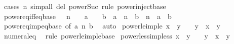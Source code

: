 \begin{isabellebody}
\ {\isacharparenleft}{\kern0pt}cases\ n{\isacharparenright}{\kern0pt}\ {\isacharparenleft}{\kern0pt}simp{\isacharunderscore}{\kern0pt}all\ del{\isacharcolon}{\kern0pt}\ power{\isacharunderscore}{\kern0pt}Suc{\isacharcomma}{\kern0pt}\ rule\ power{\isacharunderscore}{\kern0pt}inject{\isacharunderscore}{\kern0pt}base{\isacharparenright}{\kern0pt}%
\endisatagproof
{\isafoldproof}%
%
\isadelimproof
\isanewline
%
\endisadelimproof
\isanewline
{}\isamarkupfalse%
\ power{\isacharunderscore}{\kern0pt}eq{\isacharunderscore}{\kern0pt}iff{\isacharunderscore}{\kern0pt}eq{\isacharunderscore}{\kern0pt}base{\isacharcolon}{\kern0pt}\ {\isachardoublequoteopen}{}\ {\isacharless}{\kern0pt}\ n\ {\isasymLongrightarrow}\ {}\ {\isasymle}\ a\ {\isasymLongrightarrow}\ {}\ {\isasymle}\ b\ {\isasymLongrightarrow}\ a\ {\isacharcircum}{\kern0pt}\ n\ {\isacharequal}{\kern0pt}\ b\ {\isacharcircum}{\kern0pt}\ n\ {\isasymlongleftrightarrow}\ a\ {\isacharequal}{\kern0pt}\ b{\isachardoublequoteclose}\isanewline
%
\isadelimproof
\ \ %
\endisadelimproof
%
\isatagproof
{}\isamarkupfalse%
\ power{\isacharunderscore}{\kern0pt}eq{\isacharunderscore}{\kern0pt}imp{\isacharunderscore}{\kern0pt}eq{\isacharunderscore}{\kern0pt}base\ {\isacharbrackleft}{\kern0pt}of\ a\ n\ b{\isacharbrackright}{\kern0pt}\ \isamarkupfalse%
\ auto%
\endisatagproof
{\isafoldproof}%
%
\isadelimproof
\isanewline
%
\endisadelimproof
\isanewline
{}\isamarkupfalse%
\ power{}{\isacharunderscore}{\kern0pt}le{\isacharunderscore}{\kern0pt}imp{\isacharunderscore}{\kern0pt}le{\isacharcolon}{\kern0pt}\ {\isachardoublequoteopen}x\ {\isasymle}\ y\ {\isasymLongrightarrow}\ {}\ {\isasymle}\ y\ {\isasymLongrightarrow}\ x\ {\isasymle}\ y{\isachardoublequoteclose}\isanewline
%
\isadelimproof
\ \ %
\endisadelimproof
%
\isatagproof
{}\isamarkupfalse%
\ numeral{\isacharunderscore}{\kern0pt}{}{\isacharunderscore}{\kern0pt}eq{\isacharunderscore}{\kern0pt}{}\ \isamarkupfalse%
\ {\isacharparenleft}{\kern0pt}rule\ power{\isacharunderscore}{\kern0pt}le{\isacharunderscore}{\kern0pt}imp{\isacharunderscore}{\kern0pt}le{\isacharunderscore}{\kern0pt}base{\isacharparenright}{\kern0pt}%
\endisatagproof
{\isafoldproof}%
%
\isadelimproof
\isanewline
%
\endisadelimproof
\isanewline
{}\isamarkupfalse%
\ power{}{\isacharunderscore}{\kern0pt}less{\isacharunderscore}{\kern0pt}imp{\isacharunderscore}{\kern0pt}less{\isacharcolon}{\kern0pt}\ {\isachardoublequoteopen}x\ {\isacharless}{\kern0pt}\ y\ {\isasymLongrightarrow}\ {}\ {\isasymle}\ y\ {\isasymLongrightarrow}\ x\ {\isacharless}{\kern0pt}\ y{\isachardoublequoteclose}\isanewline

\end{isabellebody}
